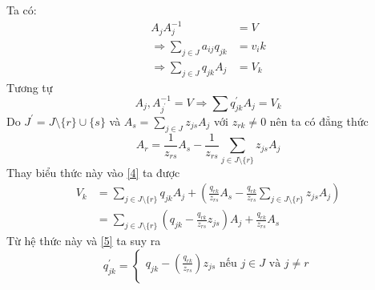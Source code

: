 \documentclass{article}
\begin{document}
\begin{enumerate}
\begin{equation}
                                \end{equation}
                            Ta có:
                                \begin{equation} \label{4}
                                    \begin{split}
                                        A_jA_j^{-1}&=V \\
                                        \Rightarrow \sum_{j \in J}a_{ij}q_{jk}&=v_ik \\
                                        \Rightarrow \sum_{j \in J}q_{jk}A_j&=V_k
                                    \end{split}
                                \end{equation}
                            Tương tự
                            \begin{equation} \label{5}
                                A_j,A_{j^{'}}^{-1}=V \Rightarrow \sum q_{jk}^{'}A_j=V_k
                            \end{equation}  
                            Do $J^{'}=J \setminus \{r\} \cup \{s\}$ và $A_s=\sum_{j \in J}z_{js}A_j$ với $z_{rk}\neq 0$ nên ta có đẳng thức \\
                            $$A_r=\frac{1}{z_{rs}}A_s - \frac{1}{z_{rs}} \sum_{j \in J \setminus \{r\}}z_{js}A_j$$  
                            Thay biểu thức này vào \eqref{4} ta được
                                \begin{equation}
                                    \begin{split}
                                        V_k&=\sum_{j \in J \setminus \{r\}}q_{jk}A_j+(\frac{q_{rk}}{z_{rs}}A_s-\frac{q_{rk}}{z_{rs}}\sum_{j \in J \setminus \{r\}}z_{js}A_j) \\
                                        &=\sum_{j \in J \setminus \{r\}}(q_{jk}-\frac{q_{rk}}{z_{rs}}z_{js})A_j + \frac{q_{rk}}{z_{rs}}A_s
                                    \end{split}
                                \end{equation}
                            Từ hệ thức này và \eqref{5} ta suy ra
                            \begin{equation} \label{6da}
                                q_{jk}^{'}=
                                \begin{cases}
                                    q_{jk}-(\frac{q_{rk}}{z_{rs}})z_{js} \text{ nếu } j \in J \text{ và } j \neq r \\

\end{cases}
\end{equation}
\end{enumerate}
\end{document}
